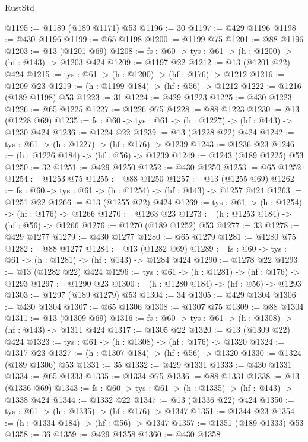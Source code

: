\begin{lexlean}{RustStd}
\begin{coremodule}
@1195 := @1189 (@189 @1171) @53
@1196 := 30
@1197 := @429 @1196
@1198 := @430 @1196
@1199 := @65 @1198
@1200 := @1199 @75
@1201 := @88 @1196
@1203 := @13 (@1201 @69)
@1208 := {fs : @60} -> {tys : @61} -> (h : @1200) -> (hf : @143) -> @1203 @424
@1209 := @1197 @22
@1212 := @13 (@1201 @22) @424
@1215 := {tys : @61} -> (h : @1200) -> (hf : @176) -> @1212
@1216 := @1209 @23
@1219 := (h : @1199 @184) -> (hf : @56) -> @1212
@1222 := @1216 (@189 @1198) @53
@1223 := 31
@1224 := @429 @1223
@1225 := @430 @1223
@1226 := @65 @1225
@1227 := @1226 @75
@1228 := @88 @1223
@1230 := @13 (@1228 @69)
@1235 := {fs : @60} -> {tys : @61} -> (h : @1227) -> (hf : @143) -> @1230 @424
@1236 := @1224 @22
@1239 := @13 (@1228 @22) @424
@1242 := {tys : @61} -> (h : @1227) -> (hf : @176) -> @1239
@1243 := @1236 @23
@1246 := (h : @1226 @184) -> (hf : @56) -> @1239
@1249 := @1243 (@189 @1225) @53
@1250 := 32
@1251 := @429 @1250
@1252 := @430 @1250
@1253 := @65 @1252
@1254 := @1253 @75
@1255 := @88 @1250
@1257 := @13 (@1255 @69)
@1262 := {fs : @60} -> {tys : @61} -> (h : @1254) -> (hf : @143) -> @1257 @424
@1263 := @1251 @22
@1266 := @13 (@1255 @22) @424
@1269 := {tys : @61} -> (h : @1254) -> (hf : @176) -> @1266
@1270 := @1263 @23
@1273 := (h : @1253 @184) -> (hf : @56) -> @1266
@1276 := @1270 (@189 @1252) @53
@1277 := 33
@1278 := @429 @1277
@1279 := @430 @1277
@1280 := @65 @1279
@1281 := @1280 @75
@1282 := @88 @1277
@1284 := @13 (@1282 @69)
@1289 := {fs : @60} -> {tys : @61} -> (h : @1281) -> (hf : @143) -> @1284 @424
@1290 := @1278 @22
@1293 := @13 (@1282 @22) @424
@1296 := {tys : @61} -> (h : @1281) -> (hf : @176) -> @1293
@1297 := @1290 @23
@1300 := (h : @1280 @184) -> (hf : @56) -> @1293
@1303 := @1297 (@189 @1279) @53
@1304 := 34
@1305 := @429 @1304
@1306 := @430 @1304
@1307 := @65 @1306
@1308 := @1307 @75
@1309 := @88 @1304
@1311 := @13 (@1309 @69)
@1316 := {fs : @60} -> {tys : @61} -> (h : @1308) -> (hf : @143) -> @1311 @424
@1317 := @1305 @22
@1320 := @13 (@1309 @22) @424
@1323 := {tys : @61} -> (h : @1308) -> (hf : @176) -> @1320
@1324 := @1317 @23
@1327 := (h : @1307 @184) -> (hf : @56) -> @1320
@1330 := @1324 (@189 @1306) @53
@1331 := 35
@1332 := @429 @1331
@1333 := @430 @1331
@1334 := @65 @1333
@1335 := @1334 @75
@1336 := @88 @1331
@1338 := @13 (@1336 @69)
@1343 := {fs : @60} -> {tys : @61} -> (h : @1335) -> (hf : @143) -> @1338 @424
@1344 := @1332 @22
@1347 := @13 (@1336 @22) @424
@1350 := {tys : @61} -> (h : @1335) -> (hf : @176) -> @1347
@1351 := @1344 @23
@1354 := (h : @1334 @184) -> (hf : @56) -> @1347
@1357 := @1351 (@189 @1333) @53
@1358 := 36
@1359 := @429 @1358
@1360 := @430 @1358

\end{coremodule}
\end{lexlean}
